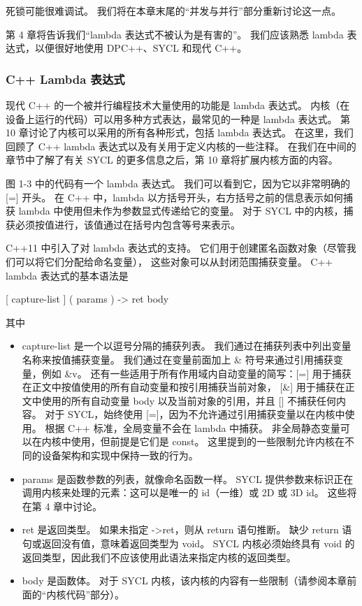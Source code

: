 死锁可能很难调试。 我们将在本章末尾的“并发与并行”部分重新讨论这一点。

\begin{remark}
	第 4 章将告诉我们“lambda 表达式不被认为是有害的”。 
	我们应该熟悉 lambda 表达式，以便很好地使用 DPC++、SYCL 和现代 C++。
\end{remark}

\subsubsection{C++ Lambda 表达式}
现代 C++ 的一个被并行编程技术大量使用的功能是 lambda 表达式。 
内核（在设备上运行的代码）可以用多种方式表达，最常见的一种是 lambda 表达式。 
第 10 章讨论了内核可以采用的所有各种形式，包括 lambda 表达式。 
在这里，我们回顾了 C++ lambda 表达式以及有关用于定义内核的一些注释。 
在我们在中间的章节中了解了有关 SYCL 的更多信息之后，第 10 章将扩展内核方面的内容。

图 1-3 中的代码有一个 lambda 表达式。 我们可以看到它，因为它以非常明确的 [=] 开头。 
在 C++ 中，lambda 以方括号开头，右方括号之前的信息表示如何捕获 lambda 中使用但未作为参数显式传递给它的变量。 
对于 SYCL 中的内核，捕获必须按值进行，该值通过在括号内包含等号来表示。

C++11 中引入了对 lambda 表达式的支持。 它们用于创建匿名函数对象（尽管我们可以将它们分配给命名变量），
这些对象可以从封闭范围捕获变量。 C++ lambda 表达式的基本语法是

[ capture-list ] ( params ) -> ret { body }


其中

\begin{itemize}
	\item capture-list 是一个以逗号分隔的捕获列表。 我们通过在捕获列表中列出变量名称来按值捕获变量。 
	我们通过在变量前面加上 \& 符号来通过引用捕获变量，例如 \&v。 
	还有一些适用于所有作用域内自动变量的简写：[=] 用于捕获在正文中按值使用的所有自动变量和按引用捕获当前对象，
	[\&] 用于捕获在正文中使用的所有自动变量 body 以及当前对象的引用，并且 [] 不捕获任何内容。 
	对于 SYCL，始终使用 [=]，因为不允许通过引用捕获变量以在内核中使用。 
	根据 C++ 标准，全局变量不会在 lambda 中捕获。 
	非全局静态变量可以在内核中使用，但前提是它们是 const。 
	这里提到的一些限制允许内核在不同的设备架构和实现中保持一致的行为。

	\item params 是函数参数的列表，就像命名函数一样。 
	SYCL 提供参数来标识正在调用内核来处理的元素：这可以是唯一的 id（一维）或 2D 或 3D id。 
	这些将在第 4 章中讨论。

	\item ret 是返回类型。 如果未指定 ->ret，则从 return 语句推断。
	缺少 return 语句或返回没有值，意味着返回类型为 void。 
	SYCL 内核必须始终具有 void 的返回类型，因此我们不应该使用此语法来指定内核的返回类型。

	\item body 是函数体。 对于 SYCL 内核，该内核的内容有一些限制（请参阅本章前面的“内核代码”部分）。
\end{itemize}

